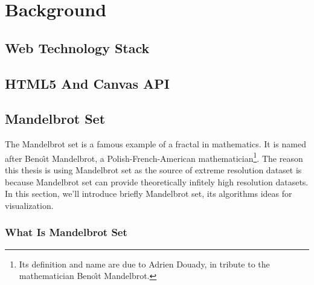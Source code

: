 
\chapter{Background} %

\label{Chapter2} %


\section{Web Technology Stack}


\section{HTML5 And Canvas API}


\section{Mandelbrot Set}

The Mandelbrot set is a famous example of a fractal in mathematics. It is named after Beno\^{\i}t Mandelbrot, a Polish-French-American mathematician\footnote{ Its definition and name are due to Adrien Douady, in tribute to the mathematician Beno\^{\i}t Mandelbrot\cite{wiki:mandel}.}. The reason this thesis is using Mandelbrot set as the source of extreme resolution dataset is because Mandelbrot set can provide theoretically infitely high resolution datasets. In this section, we'll introduce briefly Mandelbrot set, its algorithms ideas for visualization.

\subsection{What Is Mandelbrot Set}

